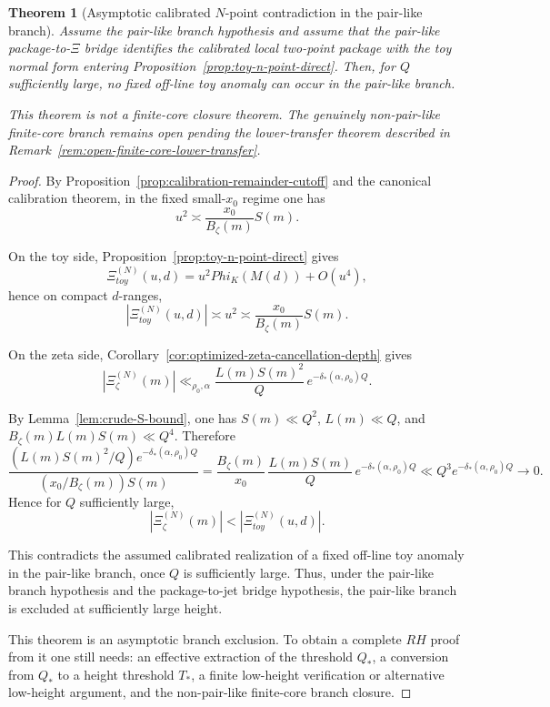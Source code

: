 \documentclass[11pt,a4paper]{amsart}
\def\Phi{Phi}%
\def\RH{RH}%
\def\toy{toy}%
\theoremstyle{plain}
\newtheorem{theorem}{Theorem}[section]
\theoremstyle{definition}
\newcommand{\RH}{\mathrm{RH}}
\newcommand{\toy}{\mathrm{toy}}
\begin{document}
\begin{theorem}[Asymptotic calibrated \(N\)-point contradiction in the pair-like branch]
\label{thm:final-contradiction}
Assume the pair-like branch hypothesis and assume that the pair-like
package-to-\(\Xi\) bridge identifies the calibrated local two-point package
with the toy normal form entering Proposition~\ref{prop:toy-n-point-direct}.
Then, for \(Q\) sufficiently large, no fixed off-line toy anomaly can occur in
the pair-like branch.

This theorem is not a finite-core closure theorem.  The genuinely non-pair-like
finite-core branch remains open pending the lower-transfer theorem described in
Remark~\ref{rem:open-finite-core-lower-transfer}.
\end{theorem}

\begin{proof}
By Proposition~\ref{prop:calibration-remainder-cutoff} and the canonical
calibration theorem, in the fixed small-$x_0$ regime one has
\[
u^2\asymp \frac{x_0}{B_\zeta(m)}S(m).
\]

On the toy side, Proposition~\ref{prop:toy-n-point-direct} gives
\[
\Xi_{\toy}^{(N)}(u,d)=u^2\Phi_K(M(d))+O(u^4),
\]
hence on compact $d$-ranges,
\[
|\Xi_{\toy}^{(N)}(u,d)|\asymp u^2
\asymp
\frac{x_0}{B_\zeta(m)}S(m).
\]

On the zeta side, Corollary~\ref{cor:optimized-zeta-cancellation-depth} gives
\[
|\Xi_\zeta^{(N)}(m)|
\ll_{\rho_0,\alpha}
\frac{L(m)S(m)^2}{Q}\,
e^{-\delta_*(\alpha,\rho_0)Q}.
\]

By Lemma~\ref{lem:crude-S-bound}, one has $S(m)\ll Q^2$, $L(m)\ll Q$, and
$B_\zeta(m)L(m)S(m)\ll Q^4$. Therefore
\[
\frac{(L(m)S(m)^2/Q)e^{-\delta_*(\alpha,\rho_0)Q}}
{(x_0/B_\zeta(m))S(m)}
=
\frac{B_\zeta(m)}{x_0}\,\frac{L(m)S(m)}{Q}\,
e^{-\delta_*(\alpha,\rho_0)Q}
\ll
Q^3 e^{-\delta_*(\alpha,\rho_0)Q}\to 0.
\]
Hence for $Q$ sufficiently large,
\[
|\Xi_\zeta^{(N)}(m)|<|\Xi_{\toy}^{(N)}(u,d)|.
\]

This contradicts the assumed calibrated realization of a fixed off-line toy
anomaly in the pair-like branch, once \(Q\) is sufficiently large.  Thus,
under the pair-like branch hypothesis and the package-to-jet bridge
hypothesis, the pair-like branch is excluded at sufficiently large height.

This theorem is an asymptotic branch exclusion.  To obtain a complete
\(\RH\) proof from it one still needs: an effective extraction of the
threshold \(Q_*\), a conversion from \(Q_*\) to a height threshold \(T_*\),
a finite low-height verification or alternative low-height argument, and
the non-pair-like finite-core branch closure.
\end{proof}
\end{document}

